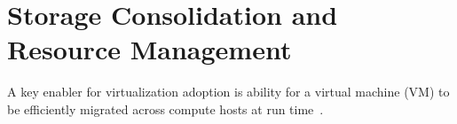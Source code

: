 \section{Storage Consolidation and Resource Management}
\label{bg_srm}

A key enabler for virtualization adoption is ability for a virtual
machine (VM) to be efficiently migrated across compute hosts at run
time~\cite{clark:2005, wood:2007, nelson:2005}.

